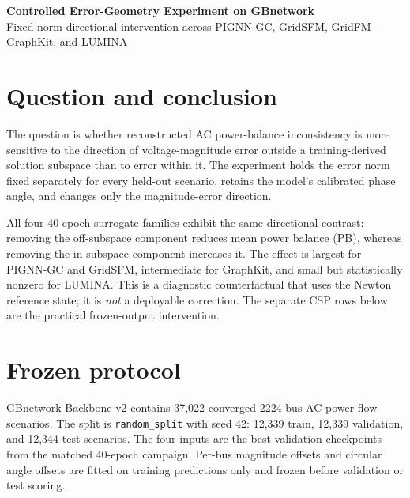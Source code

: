 \documentclass[10pt,a4paper]{article}
\begin{document}
\begin{center}
{\LARGE\bfseries\color{navy} Controlled Error-Geometry Experiment on GBnetwork}\\[.25em]
{\small Fixed-norm directional intervention across PIGNN-GC, GridSFM, GridFM-GraphKit, and LUMINA}
\end{center}

\section{Question and conclusion}

The question is whether reconstructed AC power-balance inconsistency is more
sensitive to the direction of voltage-magnitude error outside a
training-derived solution subspace than to error within it.  The experiment
holds the error norm fixed separately for every held-out scenario, retains the
model's calibrated phase angle, and changes only the magnitude-error direction.

All four 40-epoch surrogate families exhibit the same directional contrast:
removing the off-subspace component reduces mean power balance (PB), whereas
removing the in-subspace component increases it.  The effect is largest for
PIGNN-GC and GridSFM, intermediate for GraphKit, and small but statistically
nonzero for LUMINA.  This is a diagnostic counterfactual that uses the Newton
reference state; it is \emph{not} a deployable correction.  The separate CSP
rows below are the practical frozen-output intervention.

\section{Frozen protocol}

GBnetwork Backbone v2 contains 37,022 converged 2224-bus AC power-flow
scenarios.  The split is \texttt{random\_split} with seed 42: 12,339 train,
12,339 validation, and 12,344 test scenarios.  The four inputs are the
best-validation checkpoints from the matched 40-epoch campaign.  Per-bus
magnitude offsets and circular angle offsets are fitted on training predictions
only and frozen before validation or test scoring.
\end{document}
